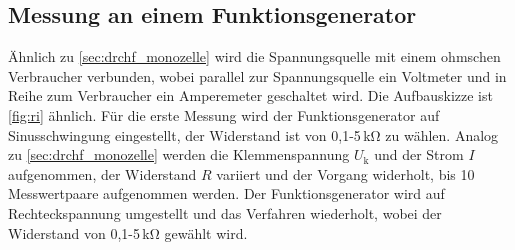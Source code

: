 \subsection{Messung an einem Funktionsgenerator}
\label{sec:drchf_funktion}
Ähnlich zu \ref{sec:drchf_monozelle} wird die Spannungsquelle mit einem ohmschen Verbraucher verbunden, wobei parallel zur Spannungsquelle ein Voltmeter und in Reihe zum Verbraucher ein Amperemeter geschaltet wird.
Die Aufbauskizze ist \ref{fig:ri} ähnlich.
Für die erste Messung wird der Funktionsgenerator auf Sinusschwingung eingestellt, der Widerstand ist von 0,1-5\,\si{\kilo\ohm} zu wählen.
Analog zu \ref{sec:drchf_monozelle} werden die Klemmenspannung  $U_\text{k}$ und der Strom $I$ aufgenommen, der Widerstand $R$ variiert und der Vorgang widerholt, bis 10 Messwertpaare aufgenommen werden.
Der Funktionsgenerator wird auf Rechteckspannung umgestellt und das Verfahren wiederholt, wobei
der Widerstand von 0,1-5\,\si{\kilo\ohm} gewählt wird.
